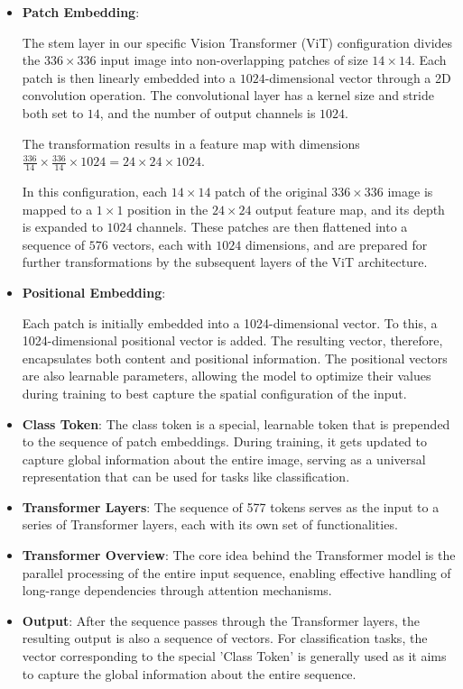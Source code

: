 \documentclass[a4paper,12pt,openright]{book}
\begin{document}
\begin{itemize}
   \item \textbf{Patch Embedding}:
    
    The stem layer in our specific Vision Transformer (ViT) configuration divides the \(336 \times 336\) input image into non-overlapping patches of size \(14 \times 14\). Each patch is then linearly embedded into a \(1024\)-dimensional vector through a 2D convolution operation. The convolutional layer has a kernel size and stride both set to \(14\), and the number of output channels is \(1024\).
    
    The transformation results in a feature map with dimensions \(\frac{336}{14} \times \frac{336}{14} \times 1024 = 24 \times 24 \times 1024\).
    
    In this configuration, each \(14 \times 14\) patch of the original \(336 \times 336\) image is mapped to a \(1 \times 1\) position in the \(24 \times 24\) output feature map, and its depth is expanded to \(1024\) channels. These patches are then flattened into a sequence of 
    \(576\) vectors, each with \(1024\) dimensions, and are prepared for further transformations by the subsequent layers of the ViT architecture.

    
    \item \textbf{Positional Embedding}:

    
    Each patch is initially embedded into a 1024-dimensional vector. To this, a 1024-dimensional positional vector is added. The resulting vector, therefore, encapsulates both content and positional information. The positional vectors are also learnable parameters, allowing the model to optimize their values during training to best capture the spatial configuration of the input.
    

    \item \textbf{Class Token}: The class token is a special, learnable token that is prepended to the sequence of patch embeddings. During training, it gets updated to capture global information about the entire image, serving as a universal representation that can be used for tasks like classification. 
    
    \newpage

    \item \textbf{Transformer Layers}: The sequence of 577 tokens serves as the input to a series of Transformer layers, each with its own set of functionalities.

    

    \item \textbf{Transformer Overview}: 
    The core idea behind the Transformer model is the parallel processing of the entire input sequence, enabling effective handling of long-range dependencies through attention mechanisms.
    
    \item \textbf{Output}: 
    After the sequence passes through the Transformer layers, the resulting output is also a sequence of vectors. For classification tasks, the vector corresponding to the special 'Class Token' is generally used as it aims to capture the global information about the entire sequence.
\end{itemize}
\end{document}
